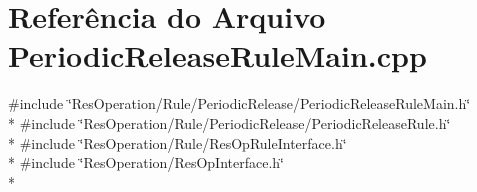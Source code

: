 \section{Referência do Arquivo Periodic\+Release\+Rule\+Main.\+cpp}
\label{_rule_2_periodic_release_2_periodic_release_rule_main_8cpp}
{\ttfamily \#include \char`\"{}Res\+Operation/\+Rule/\+Periodic\+Release/\+Periodic\+Release\+Rule\+Main.\+h\char`\"{}}\\*
{\ttfamily \#include \char`\"{}Res\+Operation/\+Rule/\+Periodic\+Release/\+Periodic\+Release\+Rule.\+h\char`\"{}}\\*
{\ttfamily \#include \char`\"{}Res\+Operation/\+Rule/\+Res\+Op\+Rule\+Interface.\+h\char`\"{}}\\*
{\ttfamily \#include \char`\"{}Res\+Operation/\+Res\+Op\+Interface.\+h\char`\"{}}\\*

